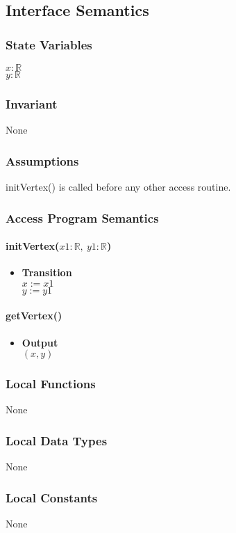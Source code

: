 \documentclass[12pt,titlepage]{article}
\begin{document}
\subsection{Interface Semantics}
\subsubsection{State Variables}
$x: \mathbb{R}$\\
$y: \mathbb{R}$
\subsubsection{Invariant} None
\subsubsection{Assumptions}initVertex() is called before any other access routine.
\subsubsection{Access Program Semantics}
\paragraph{initVertex($x1: \mathbb{R}, \ y1: \mathbb{R}$)}
\begin{itemize}
\item \textbf{Transition}\\ 
$x := x1$ \\
$y := y1$
\end{itemize}

\paragraph{getVertex()}
\begin{itemize}
\item \textbf{Output}\\ $( x, y)$ 
\end{itemize}

\subsubsection{Local Functions} None
\subsubsection{Local Data Types} None
\subsubsection{Local Constants} None
\end{document}
